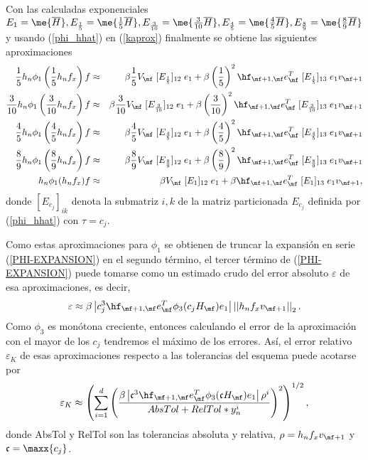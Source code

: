 Con las calculadas exponenciales $E_{1}=\me{\overline{H}},E_{\frac{1}{5}}=\me{\frac{1}{5}\overline{H}},
E_{\frac{3}{10}}=\me{\frac{3}{10}\overline{H}},E_{\frac{4}{5}}=\me{\frac{4}{5}\overline{H}},
E_{\frac{8}{9}}=\me{\frac{8}{9}\overline{H}}$ y usando (\ref{phi_hhat}) en (\ref{kaprox}) finalmente se obtiene las siguientes aproximaciones 
\begin{eqnarray*}
    \frac{1}{5}h_n\phi_1\left(\frac{1}{5}h_n f_x\right)f & \approx & \beta  \frac{1}{5} V_{\mf}\; [E_{\frac{1}{5}}]_{12}\; e_1 + \beta \left(\frac{1}{5}\right)^{2}\hf_{\mf+1,\mf}e_\mf^T\; [E_{\frac{1}{5}}]_{13}\; e_1 v_{\mf+1} \\
    \frac{3}{10}h_n\phi_1\left(\frac{3}{10}h_n f_x\right)f & \approx & \beta  \frac{3}{10} V_{\mf}\; [E_{\frac{3}{10}}]_{12}\; e_1 + \beta \left(\frac{3}{10}\right)^{2}\hf_{\mf+1,\mf}e_\mf^T\; [E_{\frac{3}{10}}]_{13}\; e_1 v_{\mf+1} \\
    \frac{4}{5}h_n\phi_1\left(\frac{4}{5}h_n f_x\right)f & \approx & \beta  \frac{4}{5} V_{\mf}\; [E_{\frac{4}{5}}]_{12}\; e_1 + \beta \left(\frac{4}{5}\right)^{2}\hf_{\mf+1,\mf}e_\mf^T\; [E_{\frac{4}{5}}]_{13}\; e_1 v_{\mf+1} \\
    \frac{8}{9}h_n\phi_1\left(\frac{8}{9}h_n f_x\right)f & \approx & \beta  \frac{8}{9} V_{\mf}\; [E_{\frac{8}{9}}]_{12}\; e_1 + \beta \left(\frac{8}{9}\right)^{2}\hf_{\mf+1,\mf}e_\mf^T\; [E_{\frac{8}{9}}]_{13}\; e_1 v_{\mf+1}  \\
    h_n\phi_1(h_n f_x)f & \approx &  \beta V_{\mf}\; [E_1]_{12}\; e_1 + \beta\hf_{\mf+1,\mf}e_\mf^T\; [E_1]_{13}\; e_1 v_{\mf+1},
\end{eqnarray*}
donde $[E_{c_j}]_{ik}$ denota la submatriz $i,k$ de la matriz particionada $E_{c_j}$ definida por (\ref{phi_hhat}) con $\tau=c_j$.

Como estas aproximaciones para $\phi_1$ se obtienen de truncar la expansi\'on en serie (\ref{PHI-EXPANSION}) en el segundo t\'ermino, el tercer término de (\ref{PHI-EXPANSION}) puede tomarse como un estimado crudo del error absoluto $\varepsilon$ de esa aproximaciones, es decir,
\[ \varepsilon \approx \beta\left\lvert  c_j^{3}\hf_{\mf+1,\mf} e_\mf^{T}\phi_3( c_jH_\mf)e_1 \right\rvert \left\lvert\left\lvert h_nf_x v_{\mf+1} \right\rvert\right\rvert_2. \] 
Como $\phi_3$ es mon\'otona creciente, entonces
calculando el error de la aproximaci\'on con el mayor de los $c_j$ tendremos el m\'aximo de los errores. Así, el error relativo $\varepsilon_{K}$ de esas aproximaciones respecto a las tolerancias del esquema puede acotarse por 
\begin{equation}
\varepsilon_{K} \approx \left(\sum\limits_{i=1}^{d} \left(\frac{\beta\left\vert \mathfrak{c}^{3}\hf_{\mf+1,\mf}
   e_\mf^{T}\phi_3(\mathfrak{c}H_\mf)e_1 \right\vert \rho^{i}}{AbsTol + RelTol*y_{n}^{i}}\right)^{2}\right)^{1/2},\label{errrel}
\end{equation}
donde AbsTol y RelTol son las tolerancias absoluta y relativa, $\rho=h_nf_x v_{\mf+1}$ y $\mathfrak{c}=\maxx{c_j}$.

